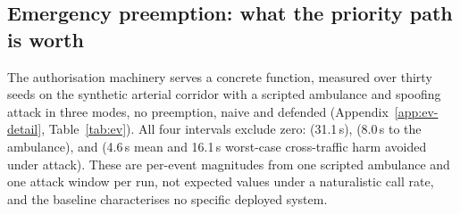 \subsection{Emergency preemption: what the priority path is worth}\label{sec:res-ev}
The authorisation machinery serves a concrete function, measured over
thirty seeds on the synthetic arterial corridor with a scripted ambulance
and spoofing attack in three modes, no preemption, naive and defended
(Appendix~\ref{app:ev-detail}, Table~\ref{tab:ev}). All four intervals
exclude zero:  (31.1\,s), 
(8.0\,s to the ambulance), and  (4.6\,s mean and 16.1\,s worst-case cross-traffic harm avoided
under attack). These are per-event magnitudes from one scripted ambulance
and one attack window per run, not expected values under a naturalistic
call rate, and the baseline characterises no specific deployed system.
